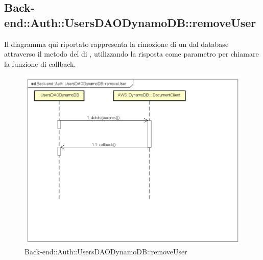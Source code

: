 \subsection{Back-end::Auth::UsersDAODynamoDB::removeUser}
Il diagramma qui riportato rappresenta la rimozione di un  dal database attraverso il metodo  del  di , utilizzando la risposta come parametro per chiamare la funzione di callback.
 \begin{figure}[h] \centering \includegraphics[width=\textwidth,height=\textheight,keepaspectratio]{images/diagrams/back-end/Ufficial_Backend/Back-endAuthUsersDAODynamoDBremoveUser.png} 	\caption{Back-end::Auth::UsersDAODynamoDB::removeUser}
\end{figure} 
\newpage


